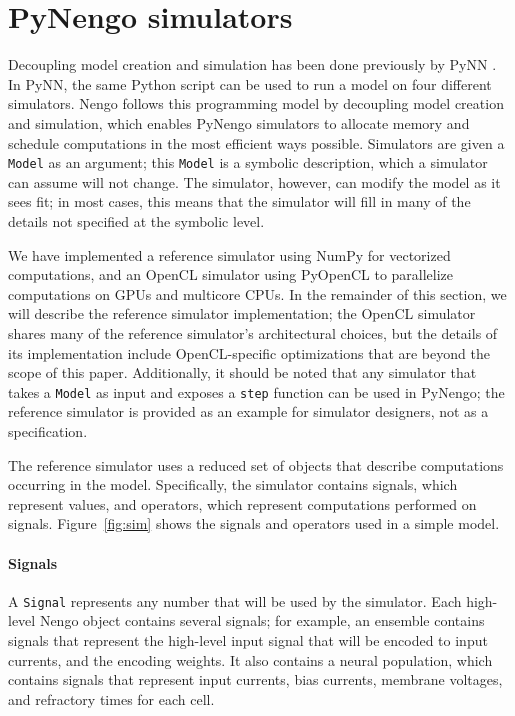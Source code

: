 \documentclass{frontiersSCNS}
\begin{document}
\section{PyNengo simulators} \label{sec:simulators}

Decoupling model creation and simulation
has been done previously
by PyNN \citep{davison2008}.
In PyNN, the same Python script
can be used to run a model
on four different simulators.
Nengo follows this programming model by
decoupling model creation and simulation,
which enables PyNengo simulators
to allocate memory and schedule computations
in the most efficient ways possible.
Simulators are given a \texttt{Model}
as an argument;
this \texttt{Model} is a symbolic description,
which a simulator can assume will not change.
The simulator, however,
can modify the model as it sees fit;
in most cases, this means that the simulator
will fill in many of the details
not specified at the symbolic level.

We have implemented
a reference simulator using NumPy
for vectorized computations,
and an OpenCL simulator
using PyOpenCL to parallelize
computations on GPUs and multicore CPUs.
In the remainder of this section,
we will describe
the reference simulator implementation;
the OpenCL simulator shares many
of the reference simulator's architectural choices,
but the details of its implementation
include OpenCL-specific optimizations
that are beyond the scope of this paper.
Additionally, it should be noted that
any simulator that takes a \texttt{Model}
as input and exposes a \texttt{step}
function can be used in PyNengo;
the reference simulator
is provided as an example
for simulator designers,
not as a specification.

\clearpage

The reference simulator
uses a reduced set of objects
that describe computations
occurring in the model.
Specifically, the simulator
contains signals, which represent values,
and operators, which represent computations
performed on signals.
Figure~\ref{fig:sim} shows the signals
and operators used in a simple model.

\paragraph{Signals}

A \texttt{Signal} represents any number that
will be used by the simulator.
Each high-level Nengo object contains
several signals;
for example, an ensemble contains signals
that represent the high-level input
signal that will be encoded
to input currents,
and the encoding weights.
It also contains a neural population,
which contains signals that represent
input currents, bias currents,
membrane voltages, and refractory times for each cell.
\end{document}

